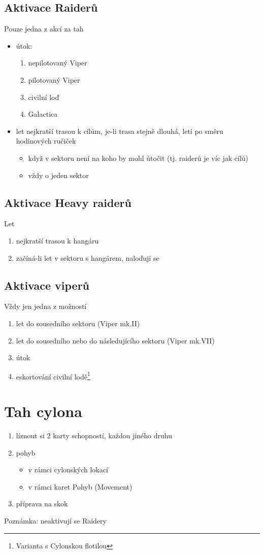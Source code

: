 \documentclass[a4paper,twocolumn]{article}
\begin{document}
\subsection{Aktivace Raiderů}
Pouze jedna z akcí za tah
\begin{itemize}
\item útok:
	\begin{enumerate}
	\item nepilotovaný Viper
	\item pilotovaný Viper
	\item civilní loď
	\item Galactica
	\end{enumerate}
\item let nejkratší trasou k cílům, je-li trasa stejně dlouhá, letí po směru hodinových ručiček
	\begin{itemize}
	\item když v sektoru není na koho by mohl útočit (tj. raiderů je víc jak cílů)
	\item vždy o jeden sektor
	\end{itemize}
\end{itemize}

\subsection{Aktivace Heavy raiderů}
Let
\begin{enumerate}
\item nejkratší trasou k hangáru
\item začíná-li let v sektoru s hangárem, naloďují se
\end{enumerate}

\subsection{Aktivace viperů}
Vždy jen jedna z možností
\begin{enumerate}
\item let do sousedního sektoru (Viper mk.II)
\item let do sousedního nebo do následujícího sektoru (Viper mk.VII)
\item útok
\item eskortování civilní lodě\footnote{Varianta s Cylonskou flotilou}
\end{enumerate}

\section{Tah cylona}
\begin{enumerate}
\item líznout si 2 karty schopností, každou jiného druhu
\item pohyb 
	\begin{itemize}
	\item v rámci cylonských lokací 
	\item v rámci karet Pohyb (Movement)
	\end{itemize}
\item příprava na skok
\end{enumerate}
Poznámka: neaktivují se Raidery
\end{document}
